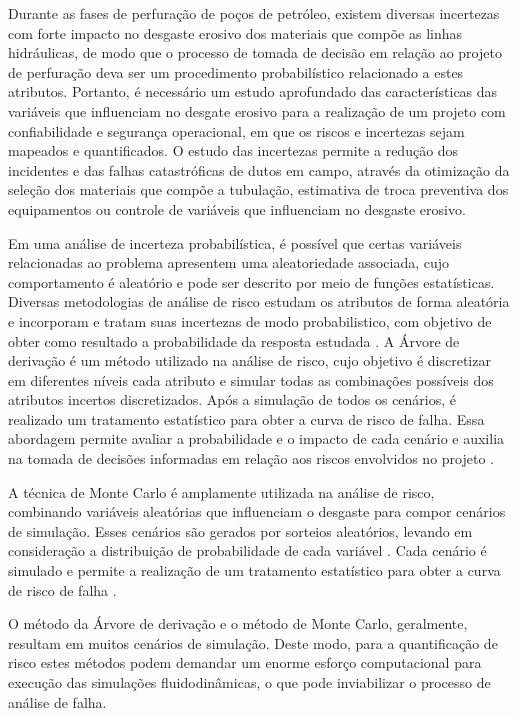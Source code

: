 Durante as fases de perfuração de poços de petróleo, existem diversas incertezas com forte impacto no desgaste erosivo dos materiais que compõe as linhas hidráulicas, de modo que o processo de tomada de decisão em relação ao projeto de perfuração deva ser um procedimento probabilístico relacionado a estes atributos. Portanto, é necessário um estudo aprofundado das características das variáveis que influenciam no desgate erosivo para a realização de um projeto com confiabilidade e segurança operacional, em que os riscos e incertezas sejam mapeados e quantificados. O estudo das incertezas permite a redução dos incidentes e das falhas catastróficas de dutos em campo, através da otimização da seleção dos materiais que compõe a tubulação, estimativa de troca preventiva dos equipamentos ou controle de variáveis que influenciam no desgaste erosivo. 

Em uma análise de incerteza probabilística, é possível que certas variáveis relacionadas ao problema apresentem uma aleatoriedade associada, cujo comportamento é aleatório e pode ser descrito por meio de funções estatísticas. Diversas metodologias de análise de risco estudam os atributos de forma aleatória e incorporam e tratam suas incertezas de modo probabilistico, com objetivo de obter como resultado a probabilidade da resposta estudada \cite{loschiavo} \cite{steagall} \cite{santoss2}. A Árvore de derivação é um método utilizado na análise de risco, cujo objetivo é discretizar em diferentes níveis cada atributo e simular todas as combinações possíveis dos atributos incertos discretizados. Após a simulação de todos os cenários, é realizado um tratamento estatístico para obter a curva de risco de falha. Essa abordagem permite avaliar a probabilidade e o impacto de cada cenário e auxilia na tomada de decisões informadas em relação aos riscos envolvidos no projeto \cite{madeira}. 

A técnica de Monte Carlo é amplamente utilizada na análise de risco, combinando variáveis aleatórias que influenciam o desgaste para compor cenários de simulação. Esses cenários são gerados por sorteios aleatórios, levando em consideração a distribuição de probabilidade de cada variável \cite{hammers}. Cada cenário é simulado e permite a realização de um tratamento estatístico para obter a curva de risco de falha \cite{Srikanta} \cite{hammers}.

O método da Árvore de derivação e o método de Monte Carlo, geralmente, resultam em muitos cenários de simulação. Deste modo, para a quantificação de risco estes métodos podem demandar um enorme esforço computacional para execução das simulações fluidodinâmicas, o que pode inviabilizar o processo de análise de falha.

